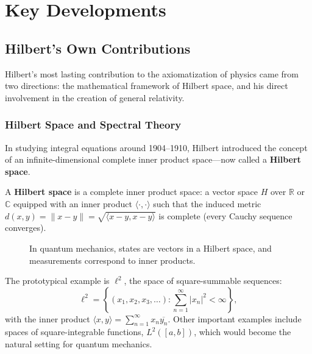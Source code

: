 \section{Key Developments}

\subsection{Hilbert's Own Contributions}

Hilbert's most lasting contribution to the axiomatization of physics came from two directions: the mathematical framework of Hilbert space, and his direct involvement in the creation of general relativity.

\subsubsection{Hilbert Space and Spectral Theory}

In studying integral equations around 1904--1910, Hilbert introduced the concept of an infinite-dimensional complete inner product space---now called a \textbf{Hilbert space}.

\begin{definition}
A \textbf{Hilbert space} is a complete inner product space: a vector space $H$ over $\mathbb{R}$ or $\mathbb{C}$ equipped with an inner product $\langle \cdot, \cdot \rangle$ such that the induced metric $d(x,y) = \|x - y\| = \sqrt{\langle x-y, x-y \rangle}$ is complete (every Cauchy sequence converges).
\end{definition}

\begin{figure}[htbp]
\centering
{}
\caption{In quantum mechanics, states are vectors in a Hilbert space, and measurements correspond to inner products.}
\label{fig:hilbert-space}
\end{figure}

The prototypical example is $\ell^2$, the space of square-summable sequences:
\[
    \ell^2 = \left\{ (x_1, x_2, x_3, \ldots) : \sum_{n=1}^{\infty} |x_n|^2 < \infty \right\},
\]
with the inner product $\langle x, y \rangle = \sum_{n=1}^{\infty} x_n \overline{y_n}$. Other important examples include spaces of square-integrable functions, $L^2([a,b])$, which would become the natural setting for quantum mechanics.

